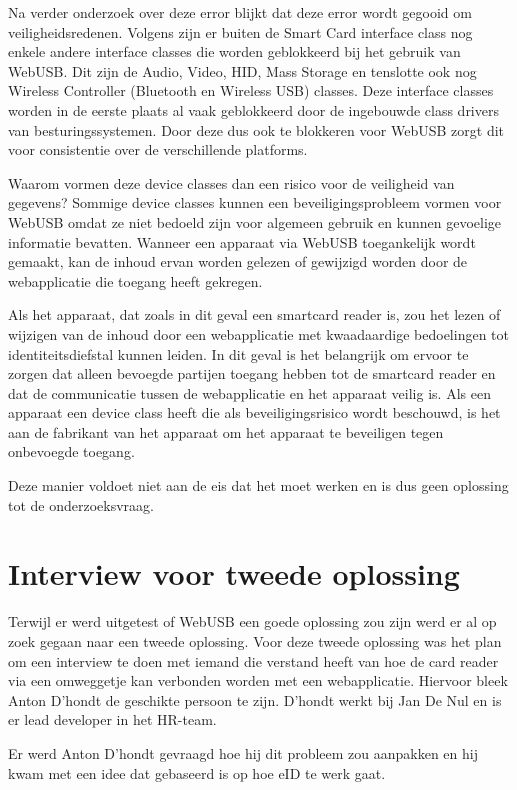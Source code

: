 Na verder onderzoek over deze error blijkt dat deze error wordt gegooid om veiligheidsredenen. Volgens \textcite{ReillyGrant} zijn er buiten de Smart Card interface class nog enkele andere interface classes die worden geblokkeerd bij het gebruik van WebUSB. Dit zijn de Audio, Video, HID, Mass Storage en tenslotte ook nog Wireless Controller (Bluetooth en Wireless USB) classes. Deze interface classes worden in de eerste plaats al vaak geblokkeerd door de ingebouwde class drivers van besturingssystemen. Door deze dus ook te blokkeren voor WebUSB zorgt dit voor consistentie over de verschillende platforms. 

Waarom vormen deze device classes dan een risico voor de veiligheid van gegevens? Sommige device classes kunnen een beveiligingsprobleem vormen voor WebUSB omdat ze niet bedoeld zijn voor algemeen gebruik en kunnen gevoelige informatie bevatten. Wanneer een apparaat via WebUSB toegankelijk wordt gemaakt, kan de inhoud ervan worden gelezen of gewijzigd worden door de webapplicatie die toegang heeft gekregen. 

Als het apparaat, dat zoals in dit geval een smartcard reader is, zou het lezen of wijzigen van de inhoud door een webapplicatie met kwaadaardige bedoelingen tot identiteitsdiefstal kunnen leiden. In dit geval is het belangrijk om ervoor te zorgen dat alleen bevoegde partijen toegang hebben tot de smartcard reader en dat de communicatie tussen de webapplicatie en het apparaat veilig is. Als een apparaat een device class heeft die als beveiligingsrisico wordt beschouwd, is het aan de fabrikant van het apparaat om het apparaat te beveiligen tegen onbevoegde toegang.

Deze manier voldoet niet aan de eis dat het moet werken en is dus geen oplossing tot de onderzoeksvraag.




\section{Interview voor tweede oplossing}
Terwijl er werd uitgetest of WebUSB een goede oplossing zou zijn werd er al op zoek gegaan naar een tweede oplossing. Voor deze tweede oplossing was het plan om een interview te doen met iemand die verstand heeft van hoe de card reader via een omweggetje kan verbonden worden met een webapplicatie. Hiervoor bleek Anton D’hondt de geschikte persoon te zijn. D'hondt werkt bij Jan De Nul en is er lead developer in het HR-team. 

Er werd Anton D'hondt gevraagd hoe hij dit probleem zou aanpakken en hij kwam met een idee dat gebaseerd is op hoe eID te werk gaat. 

